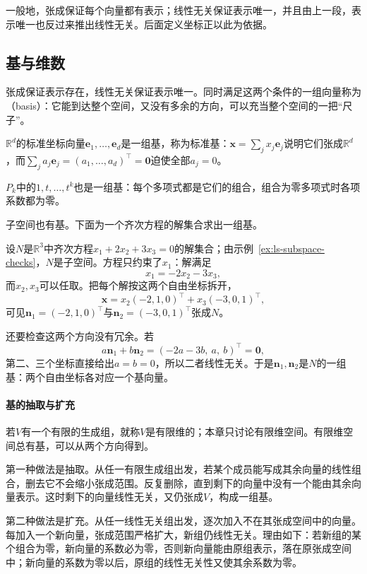 一般地，张成保证每个向量都有表示；线性无关保证表示唯一，并且由上一段，表示唯一也反过来推出线性无关。后面定义坐标正以此为依据。

\subsection{基与维数}
\label{sec:ls-basis-dimension}

张成保证表示存在，线性无关保证表示唯一。同时满足这两个条件的一组向量称为（basis）：它能到达整个空间，又没有多余的方向，可以充当整个空间的一把“尺子”。

$\mathbb R^d$的标准坐标向量$\bm e_1,\ldots,\bm e_d$是一组基，称为标准基：$\bm x=\sum_jx_j\bm e_j$说明它们张成$\mathbb R^d$，而$\sum_ja_j\bm e_j=(a_1,\ldots,a_d)^\top=\bm0$迫使全部$a_j=0$。

$P_k$中的$1,t,\ldots,t^k$也是一组基：每个多项式都是它们的组合，组合为零多项式时各项系数都为零。

子空间也有基。下面为一个齐次方程的解集合求出一组基。
\begin{example}[齐次方程解平面的一组基]
\label{ex:ls-solution-plane-basis}
设$N$是$\mathbb R^3$中齐次方程$x_1+2x_2+3x_3=0$的解集合；由示例~\ref{ex:ls-subspace-checks}，$N$是子空间。方程只约束了$x_1$：解满足
\[
 x_1=-2x_2-3x_3,
\]
而$x_2,x_3$可以任取。把每个解按这两个自由坐标拆开，
\[
 \bm x=x_2(-2,1,0)^\top+x_3(-3,0,1)^\top ,
\]
可见$\bm n_1=(-2,1,0)^\top$与$\bm n_2=(-3,0,1)^\top$张成$N$。

还要检查这两个方向没有冗余。若
\[
 a\bm n_1+b\bm n_2=(-2a-3b,\ a,\ b)^\top=\bm0,
\]
第二、三个坐标直接给出$a=b=0$，所以二者线性无关。于是$\bm n_1,\bm n_2$是$N$的一组基：两个自由坐标各对应一个基向量。
\end{example}

\paragraph{基的抽取与扩充}
若$V$有一个有限的生成组，就称$V$是有限维的；本章只讨论有限维空间。有限维空间总有基，可以从两个方向得到。

第一种做法是抽取。从任一有限生成组出发，若某个成员能写成其余向量的线性组合，删去它不会缩小张成范围。反复删除，直到剩下的向量中没有一个能由其余向量表示。这时剩下的向量线性无关，又仍张成$V$，构成一组基。

第二种做法是扩充。从任一线性无关组出发，逐次加入不在其张成空间中的向量。每加入一个新向量，张成范围严格扩大，新组仍线性无关。理由如下：若新组的某个组合为零，新向量的系数必为零，否则新向量能由原组表示，落在原张成空间中；新向量的系数为零以后，原组的线性无关性又使其余系数为零。

